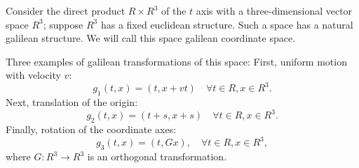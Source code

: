 Consider the direct product $R \times R^3$ of the $t$ axis with a three-dimensional vector space $R^3$; suppose $R^3$ has a fixed euclidean structure. Such a space has a natural galilean structure. We will call this space galilean coordinate space.

Three examples of galilean transformations of this space:
First, uniform motion with velocity $v$:
$$g_1(t, x) = (t, x + vt) \quad \forall t \in R, x \in R^3.$$
Next, translation of the origin:
$$g_2(t, x) = (t + s, x + s) \quad \forall t \in R, x \in R^3.$$
Finally, rotation of the coordinate axes:
$$g_3(t, x) = (t, Gx), \quad \forall t \in R, x \in R^3,$$
where $G: R^3 \rightarrow R^3$ is an orthogonal transformation.
